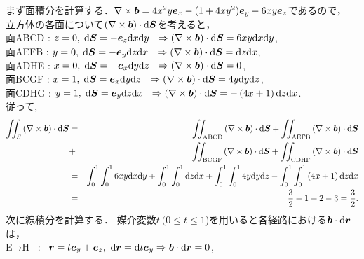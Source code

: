 \documentclass[a4paper,11pt,fleqn]{jarticle}
\def \vec#1{\mbox{\boldmath $#1$}} %
\def \rot{\nabla \times} %
\def \intt{\int\!\!\!\int} %
\begin{document}
まず面積分を計算する．$\rot \vec b=4x^2y\vec{e}_{x}-(1+4xy^2)\vec{e}_{y}-6xy\vec{e}_{z}$であるので，
立方体の各面について$\left(\nabla \times \vec{b} \right) \cdot \mathrm{d}\vec{S}$を考えると，\\[8pt]
面ABCD : $z=0,\; \mathrm{d}\vec{S}=-\vec{e}_{z}\mathrm{d}x \mathrm{d}y \ \ 
\Rightarrow \left(\nabla \times \vec{b} \right) \cdot \mathrm{d}\vec{S} = 6xy \mathrm{d}x \mathrm{d}y$,\\
面AEFB : $y=0,\; \mathrm{d}\vec{S}=-\vec{e}_{y}\mathrm{d}z \mathrm{d}x \ \ 
\Rightarrow \left(\nabla \times \vec{b} \right) \cdot \mathrm{d}\vec{S} = \mathrm{d}z \mathrm{d}x$,\\
面ADHE : $x=0,\; \mathrm{d}\vec{S}=-\vec{e}_{x}\mathrm{d}y \mathrm{d}z \ \ 
\Rightarrow \left(\nabla \times \vec{b} \right) \cdot \mathrm{d}\vec{S} = 0$,\\
面BCGF : $x=1,\; \mathrm{d}\vec{S}=\vec{e}_{x}\mathrm{d}y \mathrm{d}z \ \ 
\Rightarrow \left(\nabla \times \vec{b} \right) \cdot \mathrm{d}\vec{S} = 4y \mathrm{d}y \mathrm{d}z$,\\
面CDHG : $y=1,\; \mathrm{d}\vec{S}=\vec{e}_{y}\mathrm{d}z \mathrm{d}x \ \ 
\Rightarrow \left(\nabla \times \vec{b} \right) \cdot \mathrm{d}\vec{S} = -\left(4x+1 \right) \mathrm{d}z \mathrm{d}x$.\\[8pt]
従って,
%
\begin{eqnarray*}
\intt_{S} \left(\nabla \times \vec{b} \right) \cdot \mathrm{d}\vec{S} &=&
\intt_{\mathrm{ABCD}}\left(\nabla \times \vec{b} \right) \cdot \mathrm{d}\vec{S}
+  \intt_{\mathrm{AEFB}}\left(\nabla \times \vec{b} \right) \cdot \mathrm{d}\vec{S}\\
&+& \intt_{\mathrm{BCGF}}\left(\nabla \times \vec{b} \right) \cdot \mathrm{d}\vec{S}
+  \intt_{\mathrm{CDHF}}\left(\nabla \times \vec{b} \right) \cdot \mathrm{d}\vec{S}\\
%
&=&\int_0^1\int_0^1 6xy \mathrm{d}x \mathrm{d}y + \int_0^1\int_0^1\mathrm{d}z \mathrm{d}x
+ \int_0^1\int_0^1 4y \mathrm{d}y \mathrm{d}z - \int_0^1\int_0^1 \left(4x+1 \right) \mathrm{d}z \mathrm{d}x \\
&=&\frac{3}{2}+1+2-3=\frac{3}{2}.
\end{eqnarray*}
%
次に線積分を計算する．
媒介変数$t \ (0\le t\le 1$)を用いると各経路における$\vec{b}\cdot \mathrm{d}\vec{r}$は，\\[8pt]
E→H \ : \ $\vec{r}=t \vec{e}_{y}+\vec{e}_{z}, \ \mathrm{d}\vec{r}=\mathrm{d}t \vec{e}_{y} \Rightarrow \vec{b}\cdot \mathrm{d}\vec{r}=0$,\\
\end{document}
